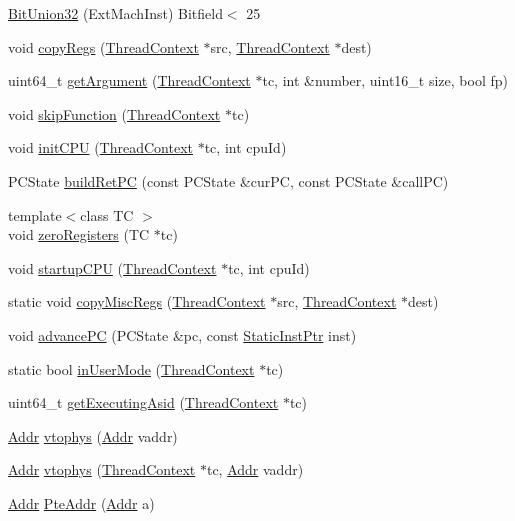 \begin{DoxyCompactItemize}
\item 
\hyperlink{namespacePowerISA_ae6138c1a89d88d75d610318542516cc3}{BitUnion32} (ExtMachInst) Bitfield$<$ 25
\item 
void \hyperlink{namespacePowerISA_aaeffcccf262b0dbd3cbcc8b4cef41168}{copyRegs} (\hyperlink{classThreadContext}{ThreadContext} $\ast$src, \hyperlink{classThreadContext}{ThreadContext} $\ast$dest)
\item 
uint64\_\-t \hyperlink{namespacePowerISA_a3f9560369e934be05b1dd8f23fbd6104}{getArgument} (\hyperlink{classThreadContext}{ThreadContext} $\ast$tc, int \&number, uint16\_\-t size, bool fp)
\item 
void \hyperlink{namespacePowerISA_a2624d7d8bac3eb03de2eb6e83903c208}{skipFunction} (\hyperlink{classThreadContext}{ThreadContext} $\ast$tc)
\item 
void \hyperlink{namespacePowerISA_aded557a1e716c6f849b0e0b05fc77676}{initCPU} (\hyperlink{classThreadContext}{ThreadContext} $\ast$tc, int cpuId)
\item 
PCState \hyperlink{namespacePowerISA_a361cc11954db6316494498bac005f406}{buildRetPC} (const PCState \&curPC, const PCState \&callPC)
\item 
{\footnotesize template$<$class TC $>$ }\\void \hyperlink{namespacePowerISA_a5aec2a8ae4e23cd090f22e7047c4598e}{zeroRegisters} (TC $\ast$tc)
\item 
void \hyperlink{namespacePowerISA_a6dd6526162d6ccc9efe5269417f96174}{startupCPU} (\hyperlink{classThreadContext}{ThreadContext} $\ast$tc, int cpuId)
\item 
static void \hyperlink{namespacePowerISA_a3f858968468b53a25f80248755f51083}{copyMiscRegs} (\hyperlink{classThreadContext}{ThreadContext} $\ast$src, \hyperlink{classThreadContext}{ThreadContext} $\ast$dest)
\item 
void \hyperlink{namespacePowerISA_a67312797a70ccb3a25803a8c0dded1a9}{advancePC} (PCState \&pc, const \hyperlink{classRefCountingPtr}{StaticInstPtr} inst)
\item 
static bool \hyperlink{namespacePowerISA_a73a1fd5ee3c94bf74abe6187141ba21f}{inUserMode} (\hyperlink{classThreadContext}{ThreadContext} $\ast$tc)
\item 
uint64\_\-t \hyperlink{namespacePowerISA_ae7c74a18f017c17c77294a09a7825d91}{getExecutingAsid} (\hyperlink{classThreadContext}{ThreadContext} $\ast$tc)
\item 
\hyperlink{base_2types_8hh_af1bb03d6a4ee096394a6749f0a169232}{Addr} \hyperlink{namespacePowerISA_a3828815371ad2b0a1be60abdcb405cf9}{vtophys} (\hyperlink{base_2types_8hh_af1bb03d6a4ee096394a6749f0a169232}{Addr} vaddr)
\item 
\hyperlink{base_2types_8hh_af1bb03d6a4ee096394a6749f0a169232}{Addr} \hyperlink{namespacePowerISA_ad4bbbca3210dee66152520984c3aac6a}{vtophys} (\hyperlink{classThreadContext}{ThreadContext} $\ast$tc, \hyperlink{base_2types_8hh_af1bb03d6a4ee096394a6749f0a169232}{Addr} vaddr)
\item 
\hyperlink{base_2types_8hh_af1bb03d6a4ee096394a6749f0a169232}{Addr} \hyperlink{namespacePowerISA_a4e1f8d20048a1b7de1f6df74adbc22f3}{PteAddr} (\hyperlink{base_2types_8hh_af1bb03d6a4ee096394a6749f0a169232}{Addr} a)
\end{DoxyCompactItemize}

